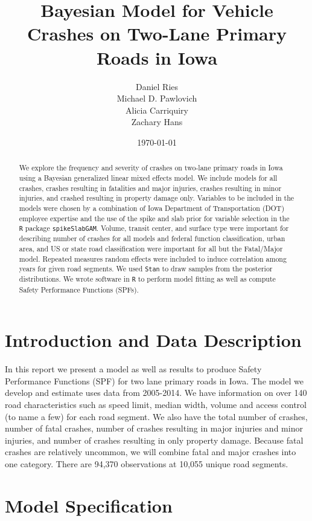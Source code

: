 \documentclass[a4paper]{article}\usepackage[]{graphicx}\usepackage[]{color}
\title{Bayesian Model for Vehicle Crashes on Two-Lane Primary Roads in Iowa}
\author{Daniel Ries \\ Michael D. Pawlovich \\ Alicia Carriquiry \\ Zachary Hans}
\date{\today}
\begin{document}
\maketitle

\begin{abstract}
We explore the frequency and severity of crashes on two-lane primary roads in Iowa using a Bayesian generalized linear mixed effects model. We include models for all crashes, crashes resulting in fatalities and major injuries, crashes resulting in minor injuries, and crashed resulting in property damage only. Variables to be included in the models were chosen by a combination of Iowa Department of Transportation (DOT) employee expertise and the use of the spike and slab prior for variable selection in the \texttt{R} package \texttt{spikeSlabGAM}. Volume, transit center, and surface type were important for describing number of crashes for all models and federal function classification, urban area, and US or state road classification were important for all but the Fatal/Major model. Repeated measures random effects were included to induce correlation among years for given road segments. We used \texttt{Stan} to draw samples from the posterior distributions. We wrote software in \texttt{R} to perform model fitting as well as compute Safety Performance Functions (SPFs).

\end{abstract}

\tableofcontents

\section{Introduction and Data Description}

In this report we present a model as well as results to produce Safety Performance Functions (SPF) for two lane primary roads in Iowa. The model we develop and estimate uses data from 2005-2014. We have information on over 140 road characteristics such as speed limit, median width, volume and access control (to name a few) for each road segment. We also have the total number of crashes, number of fatal crashes, number of crashes resulting in major injuries and minor injuries, and number of crashes resulting in only property damage. Because fatal crashes are relatively uncommon, we will combine fatal and major crashes into one category. There are 94,370 observations at 10,055 unique road segments. 


\section{Model Specification}
\end{document}
